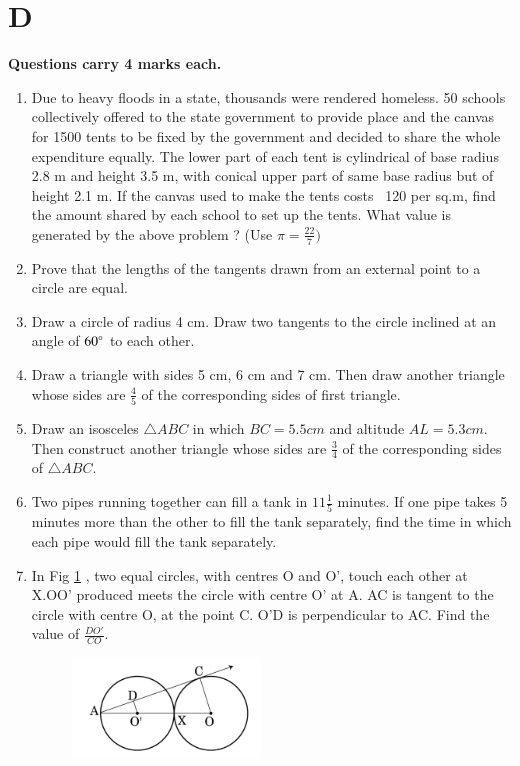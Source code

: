 \documentclass[book,11pt]{IEEEtran}
\renewcommand\thesection{\arabic{section}}
\begin{document}
\section{\textbf{D}}  
\textbf{Questions carry 4 marks each.} \\
\begin{enumerate}[label=\thesection.\arabic*.,ref=\thesection.\theenumi]
\item  Due to heavy floods in a state, thousands were rendered homeless. 50 schools collectively offered to the state government to provide place and the canvas for 1500 tents to be fixed by the government and decided to share the whole expenditure equally. The lower part of each tent is cylindrical of base radius 2.8 m and height 3.5 m, with conical upper part of same base radius but of height 2.1 m. If the canvas used to make the tents costs \rupee~120 per sq.m, find the amount shared by each school to set up the tents. What value is generated by the above problem ? (Use $ \pi = \frac{22}{7} ) $\\
 
\item Prove that the lengths of the tangents drawn from an external point to a circle are equal.\\
\item Draw a circle of radius 4 cm. Draw two tangents to the circle inclined at an angle of $ 60 \degree $ to each other.\\
\item Draw a triangle with sides 5 cm, 6 cm and 7 cm. Then draw another triangle whose sides are $\frac{4}{5}$ of the corresponding sides of first triangle.\\
\item Draw an isosceles $\triangle ABC$ in which $BC=5.5 cm$ and altitude $AL=5.3 cm$. Then construct another triangle whose sides are $\frac{3}{4}$ of the corresponding sides of $\triangle ABC$.\\
\item Two pipes running together can fill a tank in $11\frac{1}{5}$ minutes. If one pipe takes 5 minutes more than the other to fill the tank separately, find the time in which each pipe would fill the tank separately.\\
\item In Fig \ref{figure_7} , two equal circles, with centres O and O', touch each other at X.OO' produced meets the circle with centre O' at A. AC is tangent to the circle with centre O, at the point C. O'D is perpendicular to AC. Find the value of $\frac{DO'}{CO}$.\\
	\begin{figure}[h!]
      \centering
      \includegraphics[width=5cm]{figs/7.png}
      \caption{}
      \label{figure_7}
   \end{figure} 
 

\end{enumerate}
\end{document}
